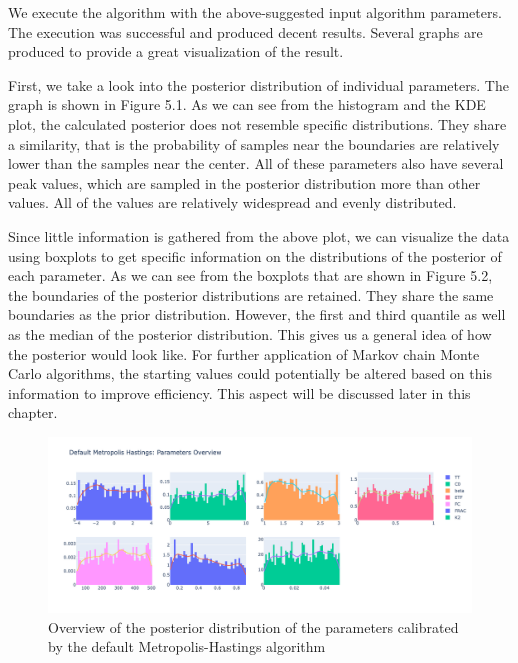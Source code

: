 We execute the algorithm with the above-suggested input algorithm parameters. The execution was successful and produced decent results. Several graphs are produced to provide a great visualization of the result. 

First, we take a look into the posterior distribution of individual parameters. The graph is shown in Figure 5.1. As we can see from the histogram and the KDE plot, the calculated posterior does not resemble specific distributions. They share a similarity, that is the probability of samples near the boundaries are relatively lower than the samples near the center. All of these parameters also have several peak values, which are sampled in the posterior distribution more than other values. All of the values are relatively widespread and evenly distributed. 

Since little information is gathered from the above plot, we can visualize the data using boxplots to get specific information on the distributions of the posterior of each parameter. As we can see from the boxplots that are shown in Figure 5.2, the boundaries of the posterior distributions are retained. They share the same boundaries as the prior distribution. However, the first and third quantile as well as the median of the posterior distribution. This gives us a general idea of how the posterior would look like. For further application of Markov chain Monte Carlo algorithms, the starting values could potentially be altered based on this information to improve efficiency. This aspect will be discussed later in this chapter.


\begin{figure}[H]
    \centering
    \includegraphics[width=1\textwidth]{figures/basic_mh/default_mh/default_mh_parameters_overview.png}
    \captionsetup{width=.8\textwidth}
    \caption{Overview of the posterior distribution of the parameters calibrated by the default Metropolis-Hastings algorithm}
    \label{fig:enter-label}
\end{figure}



